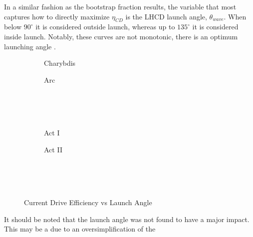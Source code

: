 In a similar fashion as the bootstrap fraction results, the variable that most captures how to directly maximize $\eta_{CD}$ is the LHCD  launch angle, $\theta_{wave}$. When below $90 ^{\circ}$ it is considered outside launch, whereas up to $135 ^{\circ}$ it is considered inside launch. Notably, these curves are not monotonic, there is an optimum launching angle .

\begin{figure*}[h!]
    \centering
    \hfill 
    \begin{subfigure}[t]{0.4\textwidth}
        \centering
    \begin{adjustbox}{width=\textwidth}
      \Large
      
    \end{adjustbox}
        \caption{Charybdis}
    \end{subfigure}
    \hfill
    \begin{subfigure}[t]{0.4\textwidth}
        \centering
    \begin{adjustbox}{width=\textwidth}
      \Large
      
    \end{adjustbox}
        \caption{Arc}
    \end{subfigure}
    \hfill \hfill ~\\ ~\\ ~\\
    \hfill 
    \begin{subfigure}[t]{0.4\textwidth}
        \centering
    \begin{adjustbox}{width=\textwidth}
      \Large
      
    \end{adjustbox}
        \caption{Act I}
    \end{subfigure}
    \hfill
    \begin{subfigure}[t]{0.4\textwidth}
        \centering
    \begin{adjustbox}{width=\textwidth}
      \Large
      
    \end{adjustbox}
        \caption{Act II}
    \end{subfigure}
    \hfill \hfill ~\\ ~\\ ~\\
    \caption{Current Drive Efficiency vs Launch Angle}
    \label{fig:launch_angle}
\end{figure*}

It should be noted that the launch angle was not found to have a major impact. This may be a due to an oversimplification of the 

%
